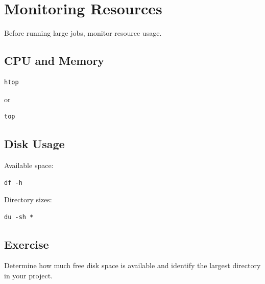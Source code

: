 \section{Monitoring Resources}

Before running large jobs, monitor resource usage.

\subsection{CPU and Memory}

\begin{lstlisting}
htop
\end{lstlisting}

or

\begin{lstlisting}
top
\end{lstlisting}

\subsection{Disk Usage}

Available space:

\begin{lstlisting}
df -h
\end{lstlisting}

Directory sizes:

\begin{lstlisting}
du -sh *
\end{lstlisting}

\subsection{Exercise}

Determine how much free disk space is available and identify the largest directory in your project.
